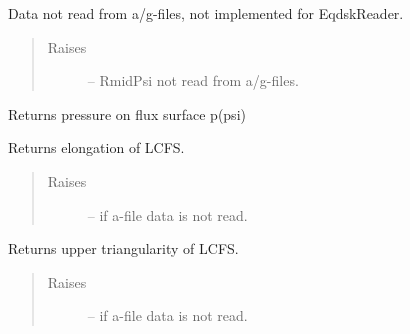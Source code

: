 \documentclass[letterpaper,10pt,english]{sphinxmanual}
\begin{document}
\begin{fulllineitems}
\begin{fulllineitems}
Data not read from a/g-files, not implemented for EqdskReader.
\begin{quote}\begin{description}
\item[{Raises }] \leavevmode
{} -- 
RmidPsi not read from a/g-files.

\end{description}\end{quote}

\end{fulllineitems}


\begin{fulllineitems}
\label{eqtools:eqtools.eqdskreader.EqdskReader.getFluxPres}
Returns pressure on flux surface p(psi)

\end{fulllineitems}


\begin{fulllineitems}
\label{eqtools:eqtools.eqdskreader.EqdskReader.getElongation}
Returns elongation of LCFS.
\begin{quote}\begin{description}
\item[{Raises }] \leavevmode
{} -- 
if a-file data is not read.

\end{description}\end{quote}

\end{fulllineitems}


\begin{fulllineitems}
\label{eqtools:eqtools.eqdskreader.EqdskReader.getUpperTriangularity}
Returns upper triangularity of LCFS.
\begin{quote}\begin{description}
\item[{Raises }] \leavevmode
{} -- 
if a-file data is not read.

\end{description}\end{quote}


\end{fulllineitems}
\end{fulllineitems}
\end{document}
